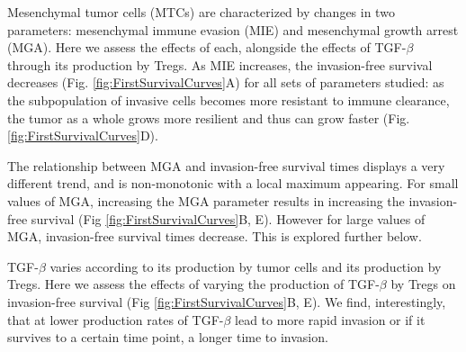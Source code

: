 \documentclass[11pt]{article}
\begin{document}
Mesenchymal tumor cells (MTCs) are characterized by changes in two parameters: mesenchymal immune evasion (MIE) and mesenchymal growth arrest (MGA). Here we assess the effects of each, alongside the effects of TGF-$\beta$ through its production by Tregs.  
As MIE increases, the invasion-free survival decreases (Fig. \ref{fig:FirstSurvivalCurves}A) for all sets of parameters studied: as the subpopulation of invasive cells becomes more resistant to immune clearance, the tumor as a whole grows more resilient and thus can grow faster (Fig. \ref{fig:FirstSurvivalCurves}D).
\par
The relationship between MGA and invasion-free survival times displays a very different trend, and is non-monotonic with a local maximum appearing. For small values of MGA, increasing the MGA parameter results in increasing the invasion-free survival (Fig \ref{fig:FirstSurvivalCurves}B, E). However for large values of MGA, invasion-free survival times decrease. This is explored further below.
\par
TGF-$\beta$ varies according to its production by tumor cells and its production by Tregs. Here we assess the effects of varying the production of  TGF-$\beta$ by Tregs on invasion-free survival (Fig \ref{fig:FirstSurvivalCurves}B, E). We find, interestingly, that at lower production rates of TGF-$\beta$ lead to more rapid invasion or if it survives to a certain time point, a longer time to invasion.

\end{document}
